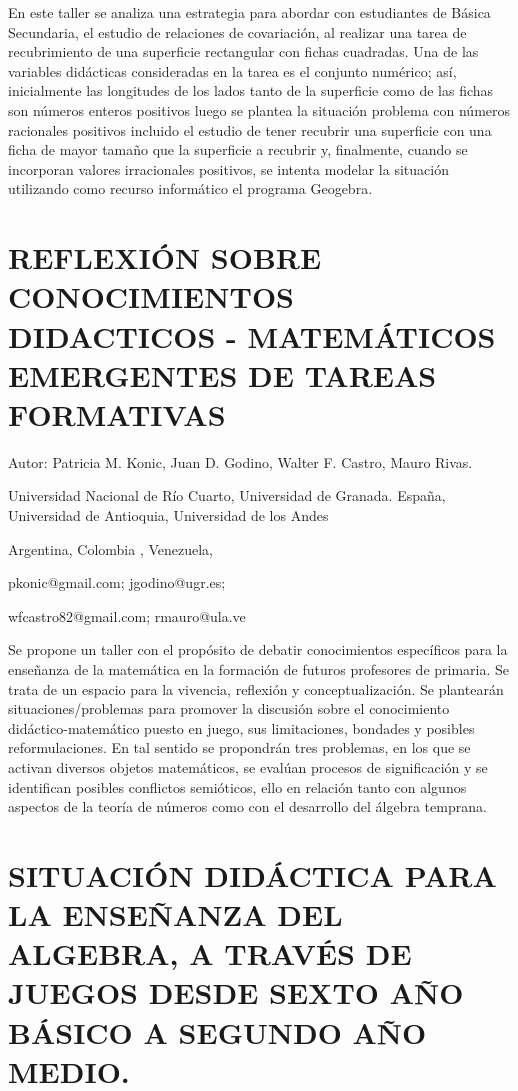 En este taller se analiza una estrategia para abordar con estudiantes
de Básica Secundaria, el estudio de relaciones de covariación, al
realizar una tarea de recubrimiento de una superficie rectangular
con fichas cuadradas. Una de las variables didácticas consideradas
en la tarea es el conjunto numérico; así, inicialmente las longitudes
de los lados tanto de la superficie como de las fichas son números
enteros positivos luego se plantea la situación problema con números
racionales positivos incluido el estudio de tener recubrir una superficie
con una ficha de mayor tamaño que la superficie a recubrir y, finalmente,
cuando se incorporan valores irracionales positivos, se intenta modelar
la situación utilizando como recurso informático el programa Geogebra.


\section{REFLEXIÓN SOBRE CONOCIMIENTOS DIDACTICOS - MATEMÁTICOS EMERGENTES
DE TAREAS FORMATIVAS}

\begin{datos}

Autor: Patricia M. Konic, Juan D. Godino, Walter F. Castro, Mauro
Rivas.

Universidad Nacional de Río Cuarto, Universidad de Granada. España,
Universidad de Antioquia, Universidad de los Andes

Argentina, Colombia , Venezuela,

pkonic@gmail.com; jgodino@ugr.es;

wfcastro82@gmail.com; rmauro@ula.ve

\end{datos}

Se propone un taller con el propósito de debatir conocimientos específicos
para la enseñanza de la matemática en la formación de futuros profesores
de primaria. Se trata de un espacio para la vivencia, reflexión y
conceptualización. Se plantearán situaciones/problemas para promover
la discusión sobre el conocimiento didáctico-matemático puesto en
juego, sus limitaciones, bondades y posibles reformulaciones. En tal
sentido se propondrán tres problemas, en los que se activan diversos
objetos matemáticos, se evalúan procesos de significación y se identifican
posibles conflictos semióticos, ello en relación tanto con algunos
aspectos de la teoría de números como con el desarrollo del álgebra
temprana. 


\section{SITUACIÓN DIDÁCTICA PARA LA ENSEÑANZA DEL ALGEBRA, A TRAVÉS DE JUEGOS
DESDE SEXTO AÑO BÁSICO A SEGUNDO AÑO MEDIO.}

